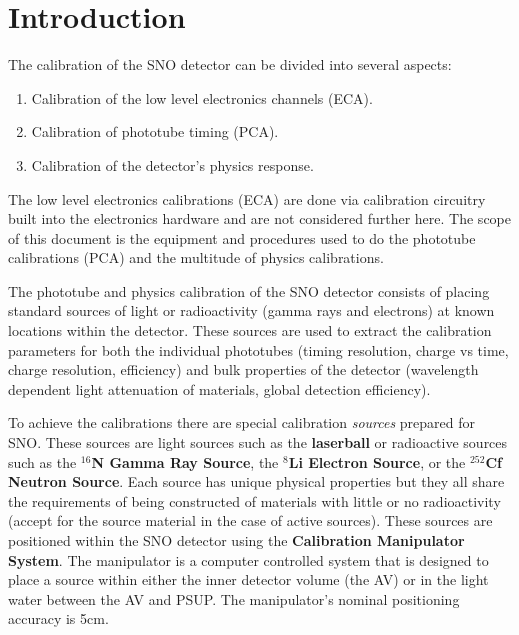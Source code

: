 


\chapter{Introduction}

 The calibration of the SNO detector can be divided into several
aspects:
\begin{enumerate}
\item Calibration of the low level electronics channels (ECA).
\item Calibration of phototube timing (PCA).
\item Calibration of the detector's physics response.
\end{enumerate}
The low level electronics calibrations (ECA) are done via calibration
circuitry built into the electronics hardware and are not considered
further here.  The scope of this document is the equipment and procedures
used to do the phototube calibrations (PCA) and the multitude of 
physics calibrations.
  
  The phototube and physics calibration of the SNO detector consists
of placing standard sources of light or radioactivity (gamma rays and
electrons) at known locations within the detector.  These sources
are used to extract the calibration parameters for both the individual
phototubes (timing resolution, charge vs time, charge resolution,
efficiency) and bulk properties of the detector (wavelength
dependent light attenuation of materials, global detection efficiency).

  To achieve the calibrations there are special calibration {\em sources}
prepared for SNO.  These sources are light sources such as the 
{\bf laserball} or radioactive sources such as the 
{\bf $^{16}$N Gamma Ray Source},
the {\bf $^{8}$Li Electron Source}, 
or the {\bf $^{252}$Cf Neutron Source}.
Each source has unique physical properties but they all share the
requirements of being constructed of materials with little or no
radioactivity (accept for the source material in the case of active
sources).  These sources are positioned within the SNO detector
using the {\bf Calibration Manipulator System}.  The manipulator 
is a computer controlled system that is designed to place a source
within either the inner detector volume (the AV) or in the light
water between the AV and PSUP.  The manipulator's nominal positioning
accuracy is 5cm. 



